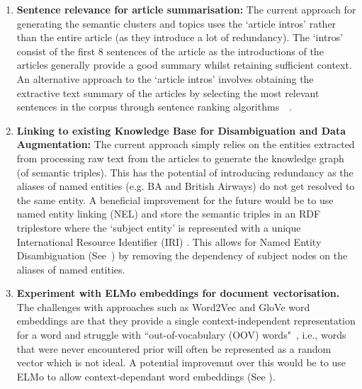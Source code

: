 \begin{enumerate}
    \item \textbf{Sentence relevance for article summarisation:} The current approach for generating the semantic clusters and topics uses the `article intros' rather than the entire article (as they introduce a lot of redundancy). The `intros' consist of the first 8 sentences of the article as the introductions of the articles generally provide a good summary whilst retaining sufficient context. An alternative approach to the `article intros' involves obtaining the extractive text summary of the articles by selecting the most relevant sentences in the corpus through sentence ranking algorithms~\cite{jevzek2008automatic}~\cite{madhuri2019extractive}. 
    
    \item \textbf{Linking to existing Knowledge Base for Disambiguation and Data Augmentation:} The current approach simply relies on the entities extracted from processing raw text from the articles to generate the knowledge graph (of semantic triples). This has the potential of introducing redundancy as the aliases of named entities (e.g. BA and British Airways) do not get resolved to the same entity. A beneficial improvement for the future would be to use named entity linking (NEL)\cite{retrospective_kg} and store the semantic triples in an RDF triplestore where the `subject entity' is represented with a unique International Resource Identifier (IRI) \cite{internationalized}. This allows for Named Entity Disambiguation (See~) by removing the dependency of subject nodes on the aliases of named entities. 
    
    \item \textbf{Experiment with ELMo embeddings for document vectorisation.}  The challenges with approaches such as Word2Vec and GloVe word embeddings are that they provide a single context-independent representation for a word and struggle with ``out-of-vocabulary (OOV) words"~\cite{elmo_word_rep}, i.e., words that were never encountered prior will often be represented as a random vector which is not ideal. A potential improvemnt over this would be to use ELMo to allow context-dependant word embeddings (See ).
    
\end{enumerate}
